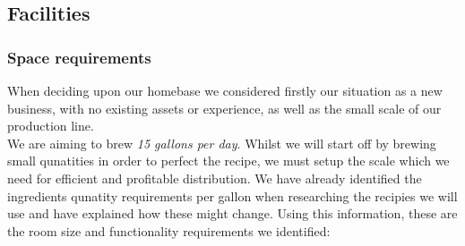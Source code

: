\documentclass[11pt]{article}
\begin{document}

 
  \subsection{Facilities}
    \subsubsection{Space requirements}
When deciding upon our homebase we considered firstly our situation as a new business, with no existing assets or experience, as well as the small scale of our production line. \\

We are aiming to brew \emph{15 gallons per day}. Whilst we will start off by brewing small qunatities in order to perfect the recipe, we must setup the scale which we need for efficient and profitable distribution. We have already identified the ingredients qunatity requirements per gallon when researching the recipies we will use and have explained how these might change. Using this information, these are the room size and functionality requirements we identified: \\
\end{document}
